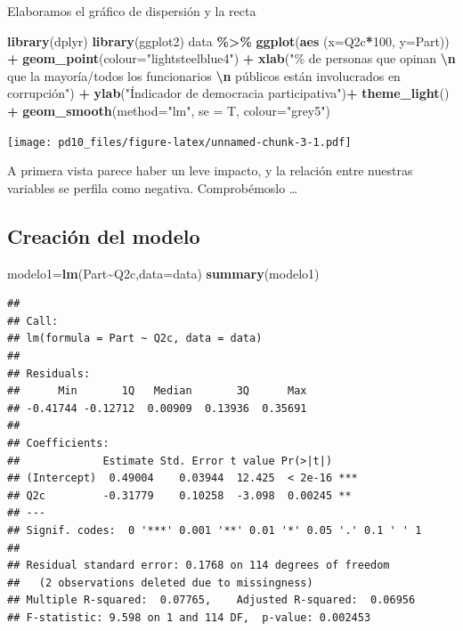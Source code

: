 \documentclass[
]{article}
\newenvironment{Shaded}{\begin{snugshade}}{\end{snugshade}}
\newcommand{\AttributeTok}[1]{\textcolor[rgb]{0.13,0.29,0.53}{#1}}
\newcommand{\DecValTok}[1]{\textcolor[rgb]{0.00,0.00,0.81}{#1}}
\newcommand{\FunctionTok}[1]{\textcolor[rgb]{0.13,0.29,0.53}{\textbf{#1}}}
\newcommand{\NormalTok}[1]{#1}
\newcommand{\OtherTok}[1]{\textcolor[rgb]{0.56,0.35,0.01}{#1}}
\newcommand{\SpecialCharTok}[1]{\textcolor[rgb]{0.81,0.36,0.00}{\textbf{#1}}}
\newcommand{\StringTok}[1]{\textcolor[rgb]{0.31,0.60,0.02}{#1}}
\begin{document}
Elaboramos el gráfico de dispersión y la recta

\begin{Shaded}
\begin{Highlighting}[]
\FunctionTok{library}\NormalTok{(dplyr)}
\FunctionTok{library}\NormalTok{(ggplot2)}
\NormalTok{data }\SpecialCharTok{\%\textgreater{}\%}
  \FunctionTok{ggplot}\NormalTok{(}\FunctionTok{aes}\NormalTok{ (}\AttributeTok{x=}\NormalTok{Q2c}\SpecialCharTok{*}\DecValTok{100}\NormalTok{, }\AttributeTok{y=}\NormalTok{Part)) }\SpecialCharTok{+}
  \FunctionTok{geom\_point}\NormalTok{(}\AttributeTok{colour=}\StringTok{"lightsteelblue4"}\NormalTok{) }\SpecialCharTok{+}  
  \FunctionTok{xlab}\NormalTok{(}\StringTok{"\% de personas que opinan }\SpecialCharTok{\textbackslash{}n}\StringTok{ que la mayoría/todos  los funcionarios }\SpecialCharTok{\textbackslash{}n}\StringTok{ }
\StringTok{       públicos están involucrados en corrupción"}\NormalTok{) }\SpecialCharTok{+}  
  \FunctionTok{ylab}\NormalTok{(}\StringTok{"Índicador de democracia participativa"}\NormalTok{)}\SpecialCharTok{+} \FunctionTok{theme\_light}\NormalTok{() }\SpecialCharTok{+} 
  \FunctionTok{geom\_smooth}\NormalTok{(}\AttributeTok{method=}\StringTok{"lm"}\NormalTok{, }\AttributeTok{se =}\NormalTok{ T, }\AttributeTok{colour=}\StringTok{"grey5"}\NormalTok{)}
\end{Highlighting}
\end{Shaded}

\texttt{[image: pd10\_files/figure-latex/unnamed-chunk-3-1.pdf]}

A primera vista parece haber un leve impacto, y la relación entre
nuestras variables se perfila como negativa. Comprobémoslo \ldots{}

\hypertarget{creaciuxf3n-del-modelo}{%
\subsection{Creación del modelo}\label{creaciuxf3n-del-modelo}}

\begin{Shaded}
\begin{Highlighting}[]
\NormalTok{modelo1}\OtherTok{=}\FunctionTok{lm}\NormalTok{(Part}\SpecialCharTok{\textasciitilde{}}\NormalTok{Q2c,}\AttributeTok{data=}\NormalTok{data)}
\FunctionTok{summary}\NormalTok{(modelo1)}
\end{Highlighting}
\end{Shaded}

\begin{verbatim}
## 
## Call:
## lm(formula = Part ~ Q2c, data = data)
## 
## Residuals:
##      Min       1Q   Median       3Q      Max 
## -0.41744 -0.12712  0.00909  0.13936  0.35691 
## 
## Coefficients:
##             Estimate Std. Error t value Pr(>|t|)    
## (Intercept)  0.49004    0.03944  12.425  < 2e-16 ***
## Q2c         -0.31779    0.10258  -3.098  0.00245 ** 
## ---
## Signif. codes:  0 '***' 0.001 '**' 0.01 '*' 0.05 '.' 0.1 ' ' 1
## 
## Residual standard error: 0.1768 on 114 degrees of freedom
##   (2 observations deleted due to missingness)
## Multiple R-squared:  0.07765,    Adjusted R-squared:  0.06956 
## F-statistic: 9.598 on 1 and 114 DF,  p-value: 0.002453
\end{verbatim}
\end{document}
